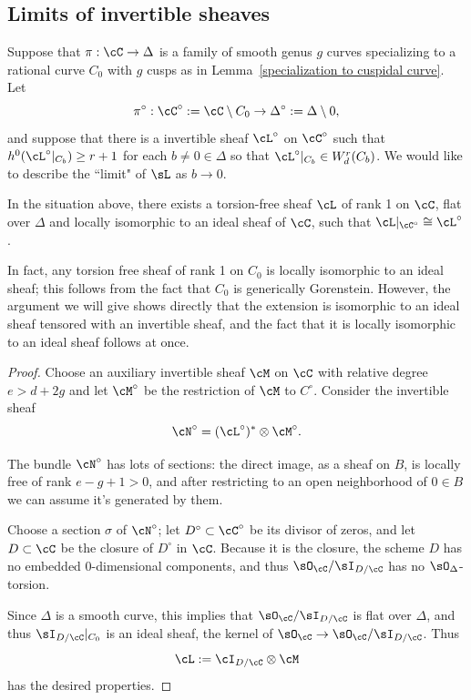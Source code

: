 \subsection{Limits of invertible sheaves}\label{invertible sheaf limits}


Suppose  that  $\pi : \cC \to \Delta$ is a family of smooth genus $g$ curves specializing to a rational curve $C_0$ with $g$ cusps as in Lemma~\ref{specialization to cuspidal curve}. 
 Let 
$$
\pi^\circ: \cC^\circ := \cC \setminus C_0\to \Delta^\circ := \Delta\setminus 0,
$$
and suppose that there is a invertible sheaf $\cL^\circ$ on $\cC^\circ$ such that $h^0(\cL^\circ|_{C_b}) \geq r+1$ for each $b \neq 0 \in \Delta$ so that $\cL^\circ|_{C_b}\in W^{r}_{d}(C_{b})$. We would like to describe the ``limit" of $\sL$ as $b \to 0$. 


\begin{lemma}\label{limit sheaf}
In the situation above, there exists a torsion-free sheaf $\cL$ of rank 1 on $\cC$, flat over $\Delta$ and locally isomorphic to
an ideal sheaf of $\cC$, such that $\cL|_{\cC^\circ} \cong \cL^\circ$.
\end{lemma}

In fact, any torsion free sheaf of rank 1 on $C_{0}$ is locally isomorphic
to an ideal sheaf; this follows from the fact that $C_{0}$ is generically Gorenstein. However, the argument we will give 
shows directly that the extension is isomorphic to an ideal sheaf tensored with an invertible sheaf, and the fact that
it is locally isomorphic to an ideal sheaf follows at once.

\begin{proof} Choose an auxiliary invertible sheaf $\cM$ on $\cC$ with relative degree $e > d + 2g$ and let $\cM^\circ$ be the restriction of $\cM$ to $C^\circ$. Consider the invertible sheaf 
$$
\cN^\circ = (\cL^\circ)^* \otimes \cM^\circ.
$$

The bundle $\cN^\circ$ has lots of sections: the direct image, as a sheaf on $B$, is locally free of rank $e-g+1 > 0$, and after restricting to an open neighborhood of $0 \in B$ we can assume it's generated by them. 

Choose a section $\sigma$ of $\cN^\circ$; let $D^\circ \subset \cC^\circ$ be its divisor of zeros, and let $D \subset \cC$ be the closure of $D^\circ$ in $\cC$. Because it is the closure, the scheme $D$ has no embedded 
0-dimensional components, and thus $\sO_{\cC}/\sI_{D/\cC}$ has no $\sO_{\Delta}$-torsion. 

Since $\Delta$ is a smooth
curve, this implies that $\sO_{\cC}/\sI_{D/\cC}$ is flat over $\Delta$, and thus $\sI_{D/\cC}|_{C_{0}}$
is an ideal sheaf, the kernel of $\sO_{\cC} \to \sO_{\cC}/\sI_{D/\cC}$. Thus
$$
\cL := \cI_{D/\cC} \otimes \cM
$$
has the desired properties. 
\end{proof}


